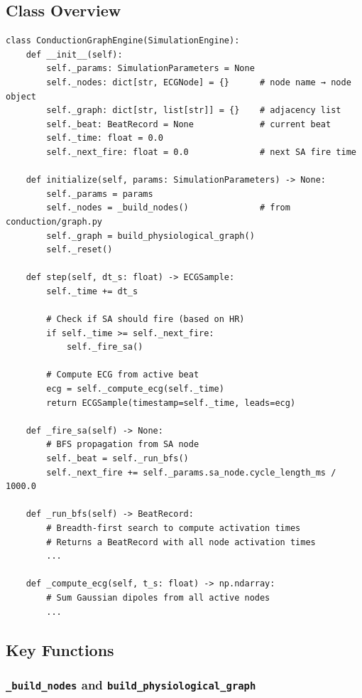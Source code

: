 \documentclass[12pt,a4paper,oneside]{book}
\begin{document}
\subsection{Class Overview}

\begin{lstlisting}
class ConductionGraphEngine(SimulationEngine):
    def __init__(self):
        self._params: SimulationParameters = None
        self._nodes: dict[str, ECGNode] = {}      # node name → node object
        self._graph: dict[str, list[str]] = {}    # adjacency list
        self._beat: BeatRecord = None             # current beat
        self._time: float = 0.0
        self._next_fire: float = 0.0              # next SA fire time
    
    def initialize(self, params: SimulationParameters) -> None:
        self._params = params
        self._nodes = _build_nodes()              # from conduction/graph.py
        self._graph = build_physiological_graph()
        self._reset()
    
    def step(self, dt_s: float) -> ECGSample:
        self._time += dt_s
        
        # Check if SA should fire (based on HR)
        if self._time >= self._next_fire:
            self._fire_sa()
        
        # Compute ECG from active beat
        ecg = self._compute_ecg(self._time)
        return ECGSample(timestamp=self._time, leads=ecg)
    
    def _fire_sa(self) -> None:
        # BFS propagation from SA node
        self._beat = self._run_bfs()
        self._next_fire += self._params.sa_node.cycle_length_ms / 1000.0
    
    def _run_bfs(self) -> BeatRecord:
        # Breadth-first search to compute activation times
        # Returns a BeatRecord with all node activation times
        ...
    
    def _compute_ecg(self, t_s: float) -> np.ndarray:
        # Sum Gaussian dipoles from all active nodes
        ...
\end{lstlisting}

\subsection{Key Functions}

\subsubsection{\texttt{\_build\_nodes} and \texttt{build\_physiological\_graph}}
\end{document}
